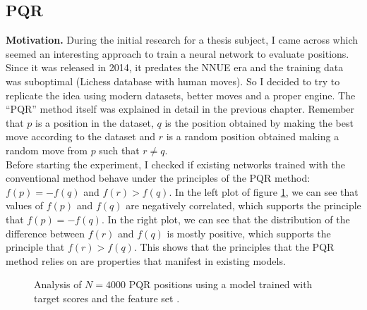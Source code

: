 \newpage
\subsection{PQR}

\textbf{Motivation.} During the initial research for a thesis subject, I came across \cite{dlchess:2014} which seemed an interesting approach to train a neural network to evaluate positions. Since it was released in 2014, it predates the NNUE era and the training data was suboptimal (Lichess database \cite{lichessdb} with human moves). So I decided to try to replicate the idea using modern datasets, better moves and a proper engine. The \enquote{PQR} method itself was explained in detail in the previous chapter.  Remember that $p$ is a position in the dataset, $q$ is the position obtained by making the best move according to the dataset and $r$ is a random position obtained making a random move from $p$ such that $r \neq q$. \\

Before starting the experiment, I checked if existing networks trained with the conventional method behave under the principles of the PQR method: ${f(p) = -f(q)}$ and ${f(r) > f(q)}$. In the left plot of figure \ref{pqr-eval}, we can see that values of $f(p)$ and $f(q)$ are negatively correlated, which supports the principle that $f(p)=-f(q)$. In the right plot, we can see that the distribution of the difference between $f(r)$ and $f(q)$ is mostly positive, which supports the principle that $f(r) > f(q)$. This shows that the principles that the PQR method relies on are properties that manifest in existing models.

\begin{figure}[H]
\centering
{}
\caption{Analysis of $N=4000$ PQR positions using a model trained with target scores and the feature set .}
\label{pqr-eval}
\end{figure}

